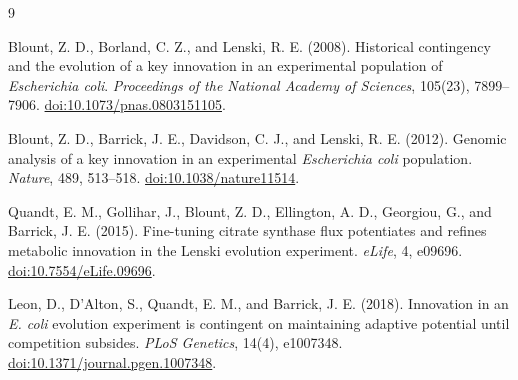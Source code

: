 \documentclass[11pt]{article}
\begin{document}
\begin{thebibliography}{9}

Blount, Z. D., Borland, C. Z., and Lenski, R. E. (2008).
Historical contingency and the evolution of a key innovation in an experimental population of \emph{Escherichia coli}.
\emph{Proceedings of the National Academy of Sciences}, 105(23), 7899--7906.
\href{https://doi.org/10.1073/pnas.0803151105}{doi:10.1073/pnas.0803151105}.

Blount, Z. D., Barrick, J. E., Davidson, C. J., and Lenski, R. E. (2012).
Genomic analysis of a key innovation in an experimental \emph{Escherichia coli} population.
\emph{Nature}, 489, 513--518.
\href{https://doi.org/10.1038/nature11514}{doi:10.1038/nature11514}.

Quandt, E. M., Gollihar, J., Blount, Z. D., Ellington, A. D., Georgiou, G., and Barrick, J. E. (2015).
Fine-tuning citrate synthase flux potentiates and refines metabolic innovation in the Lenski evolution experiment.
\emph{eLife}, 4, e09696.
\href{https://doi.org/10.7554/eLife.09696}{doi:10.7554/eLife.09696}.

Leon, D., D'Alton, S., Quandt, E. M., and Barrick, J. E. (2018).
Innovation in an \emph{E. coli} evolution experiment is contingent on maintaining adaptive potential until competition subsides.
\emph{PLoS Genetics}, 14(4), e1007348.
\href{https://doi.org/10.1371/journal.pgen.1007348}{doi:10.1371/journal.pgen.1007348}.

\end{thebibliography}
\end{document}
